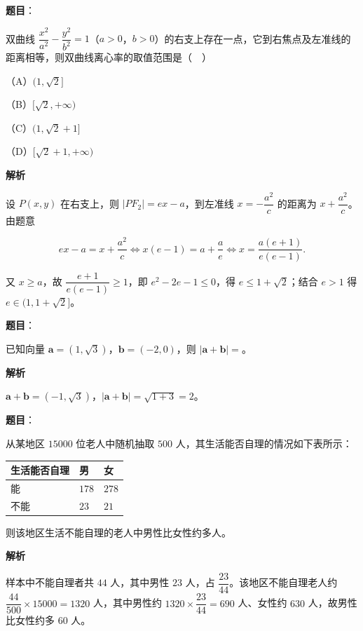 \begin{answer}

\textbf{题目}：

双曲线 $\dfrac{x^2}{a^2}-\dfrac{y^2}{b^2}=1$（$a>0$，$b>0$）的右支上存在一点，它到右焦点及左准线的距离相等，则双曲线离心率的取值范围是（　）

（A）$(1,\sqrt2]$

（B）$[\sqrt2,+\infty)$

（C）$(1,\sqrt2+1]$

（D）$[\sqrt2+1,+\infty)$

\textbf{解析}

设 $P(x,y)$ 在右支上，则 $|PF_2|=ex-a$，到左准线 $x=-\dfrac{a^2}c$ 的距离为 $x+\dfrac{a^2}c$。由题意

\nopagebreak[4]
\[ex-a=x+\frac{a^2}c\iff x(e-1)=a+\frac a{e}\iff x=\frac{a(e+1)}{e(e-1)}.\]

又 $x\geqslant a$，故 $\dfrac{e+1}{e(e-1)}\geqslant1$，即 $e^2-2e-1\leqslant0$，得 $e\leqslant1+\sqrt2$；结合 $e>1$ 得 $e\in(1,1+\sqrt2]$。


\end{answer}
\begin{answer}

\textbf{题目}：

已知向量 $\boldsymbol a=(1,\sqrt3)$，$\boldsymbol b=(-2,0)$，则 $|\boldsymbol a+\boldsymbol b|=$\gkblank{}。

\textbf{解析}

$\boldsymbol a+\boldsymbol b=(-1,\sqrt3)$，$|\boldsymbol a+\boldsymbol b|=\sqrt{1+3}=2$。


\end{answer}
\begin{answer}

\textbf{题目}：

从某地区 $15000$ 位老人中随机抽取 $500$ 人，其生活能否自理的情况如下表所示：

\begin{center}
\begin{tabular}{lll}
\toprule
生活能否自理 & 男 & 女 \\
\midrule
能 & $178$ & $278$ \\
不能 & $23$ & $21$ \\
\bottomrule
\end{tabular}
\end{center}

则该地区生活不能自理的老人中男性比女性约多\gkblank{}人。

\textbf{解析}

样本中不能自理者共 $44$ 人，其中男性 $23$ 人，占 $\dfrac{23}{44}$。该地区不能自理老人约 $\dfrac{44}{500}\times15000=1320$ 人，其中男性约 $1320\times\dfrac{23}{44}=690$ 人、女性约 $630$ 人，故男性比女性约多 $60$ 人。


\end{answer}
